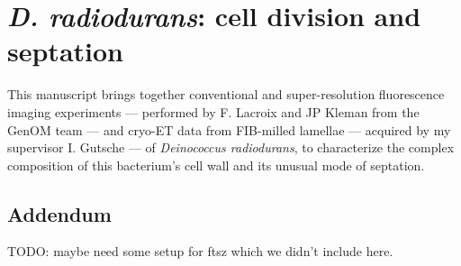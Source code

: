 \chapter{\textit{D. radiodurans}: cell division and septation}\label{drad}

This manuscript brings together conventional and super-resolution fluorescence imaging experiments --- performed by F. Lacroix and JP Kleman from the GenOM team --- and cryo-ET data from FIB-milled lamellae --- acquired by my supervisor I. Gutsche --- of \textit{Deinococcus radiodurans}, to characterize the complex composition of this bacterium's cell wall and its unusual mode of septation.

\localtableofcontents
\newpage

\newpage

\section{Addendum}

TODO: maybe need some setup for ftsz which we didn't include here.
